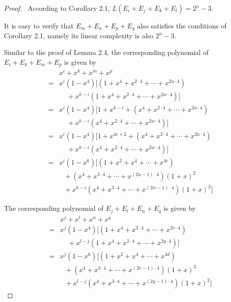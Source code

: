 \documentclass[10pt,conference,twocolumn]{IEEEtran}
\begin{document}
\begin{proof}\
According to Corollary 2.1, $L(E_i+E_j+E_k+E_l)=2^n-3$.

It is easy to verify that $E_m+E_n+E_p+E_q$ also satisfies the
conditions of Corollary 2.1, namely its linear complexity is also
$2^n-3$.

Similar to the proof of Lemma 2.4, the corresponding polynomial of
$E_i+E_k+E_m+E_p$ is given by
\begin{eqnarray*}
&&x^i+x^k+x^m+x^p\\
&=&x^i(1-x^{4})[(1+x^{4}+x^{2\cdot4}+\cdots +x^{2u\cdot4})\\
&&\ \ \ \ \ +x^{k-i}(1+x^{4}+x^{2\cdot4}+\cdots +x^{2w\cdot4})]\\
&=&x^i(1-x^{4})[1+x^{k-i}+(x^{4}+x^{2\cdot4}+\cdots +x^{2u\cdot4})\\
&&\ \ \ \ \ +x^{k-i}(x^{4}+x^{2\cdot4}+\cdots +x^{2w\cdot4})]\\
&=&x^i(1-x^{4})[1+x^{4c+2}+(x^{4}+x^{2\cdot4}+\cdots +x^{2u\cdot4})\\
&&\ \ \ \ \ +x^{k-i}(x^{4}+x^{2\cdot4}+\cdots +x^{2w\cdot4})]\\
&=&x^i(1-x^{6})[(1+x^2+x^{4}+\cdots+x^{4c})\\
&&\ \ \  +(x^{4}+x^{3\cdot4}+\cdots +x^{(2u-1)\cdot4})(1+x)^{2}\\
&&\ \ \  +x^{k-i}(x^{4}+x^{3\cdot4}+\cdots
+x^{(2w-1)\cdot4})(1+x)^{2}]
 \end{eqnarray*}

The corresponding polynomial of $E_j+E_l+E_n+E_q$ is given by
\begin{eqnarray*}
&&x^j+x^l+x^n+x^q\\
&=&x^j(1-x^{4})[(1+x^{4}+x^{2\cdot4}+\cdots +x^{2v\cdot4})\\
&&\ \ \ \ \ +x^{l-j}(1+x^{4}+x^{2\cdot4}+\cdots +x^{2y\cdot4})]\\
&=&x^j(1-x^{6})[(1+x^2+x^{4}+\cdots+x^{4d})\\
&&\ \ \  +(x^{4}+x^{3\cdot4}+\cdots +x^{(2v-1)\cdot4})(1+x)^{2}\\
&&\ \ \  +x^{l-j}(x^{4}+x^{3\cdot4}+\cdots
+x^{(2y-1)\cdot4})(1+x)^{2}]
 \end{eqnarray*}


\end{proof}
\end{document}

